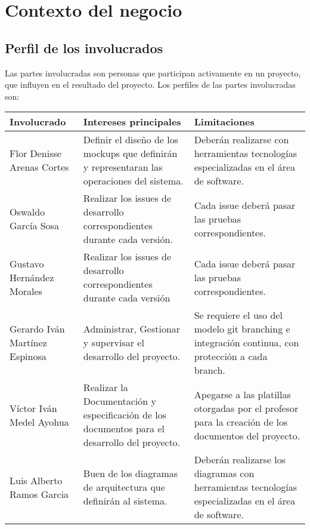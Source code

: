 \documentclass[12pt,a4paper]{book}
\begin{document}
\chapter{Contexto del negocio}
\section{Perfil de los involucrados}
Las partes involucradas son personas que participan activamente en un proyecto, que influyen en el resultado del proyecto. Los perfiles de las partes involucradas son:
\begin{table}[h!]
\begin{tabular}{|p{5 cm}|p{5 cm}|p{5 cm}|}
\hline
\textbf{Involucrado}&\textbf{Intereses principales}&\textbf{Limitaciones}
\\\hline

Flor Denisse Arenas Cortes&Definir el diseño de los mockups que definirán y representaran las operaciones del sistema. & Deberán realizarse con herramientas tecnologías especializadas en el área de software.\\\hline

Oswaldo García Sosa&Realizar los issues de desarrollo correspondientes durante cada versión. &Cada issue deberá pasar las pruebas correspondientes.\\\hline

Gustavo Hernández Morales&Realizar los issues de desarrollo correspondientes durante cada versión &Cada issue deberá pasar las pruebas correspondientes.\\\hline

Gerardo Iván Martínez Espinosa & Administrar, Gestionar y supervisar el desarrollo del proyecto.&Se requiere el uso del modelo git branching e integración continua, con protección a cada branch.\\\hline

Víctor Iván Medel Ayohua &Realizar la Documentación y especificación de los documentos para el desarrollo del proyecto.&Apegarse a las platillas otorgadas por el profesor para la creación de los documentos del proyecto.\\\hline

Luis Alberto Ramos Garcia&Buen de los diagramas de arquitectura que definirán al sistema. & Deberán realizarse los diagramas con herramientas tecnologías especializadas en el área de software.\\\hline
\end{tabular}
\end{table}
\newpage
\end{document}
